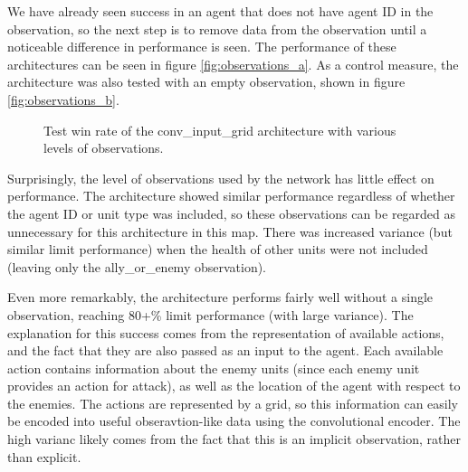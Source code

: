 We have already seen success in an agent that does not have agent ID in the observation, so the next step is to remove data from the observation until a noticeable difference in performance is seen. The performance of these architectures can be seen in figure \ref{fig:observations_a}. As a control measure, the architecture was also tested with an empty observation, shown in figure \ref{fig:observations_b}.

\begin{figure}[!tbp]
  \centering
  \hfill
  \caption{Test win rate of the conv\_input\_grid architecture with various levels of observations.}
\end{figure}


Surprisingly, the level of observations used by the network has little effect on performance. The architecture showed similar performance regardless of whether the agent ID or unit type was included, so these observations can be regarded as unnecessary for this architecture in this map. There was increased variance (but similar limit performance) when the health of other units were not included (leaving only the ally\_or\_enemy observation). 

Even more remarkably, the architecture performs fairly well without a single observation, reaching 80+\% limit performance (with large variance). The explanation for this success comes from the representation of available actions, and the fact that they are also passed as an input to the agent. Each available action contains information about the enemy units (since each enemy unit provides an action for attack), as well as the location of the agent with respect to the enemies. The actions are represented by a grid, so this information can easily be encoded into useful obseravtion-like data using the convolutional encoder. The high varianc likely comes from the fact that this is an implicit observation, rather than explicit.

